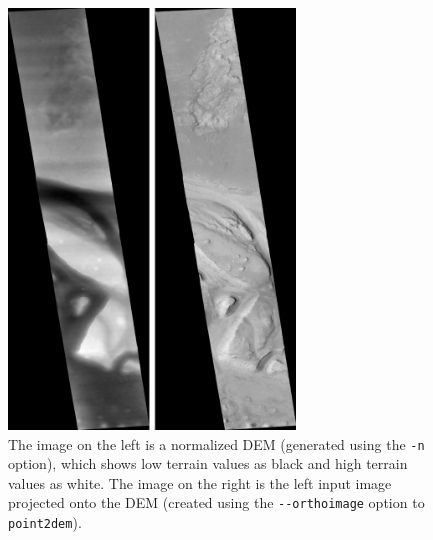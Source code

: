 \begin{figure}
\hfill
\begin{minipage}{3in}
\includegraphics[width=3in]{images/p19-norm_ortho.png}
\end{minipage}
\hspace{2em}
\begin{minipage}{2in}
\caption[P19 Normalized DEM and Orthophoto]{
    \label{p19-norm_ortho}
	The image on the left is a normalized DEM (generated using the
        \texttt{-n} option), which shows low terrain values as black
        and high terrain values as white.  The image on the right is
        the left input image projected onto the DEM (created using the
        \texttt{-\/-orthoimage} option to \texttt{point2dem}).  }
\end{minipage} 
\hfill
\end{figure}

%

